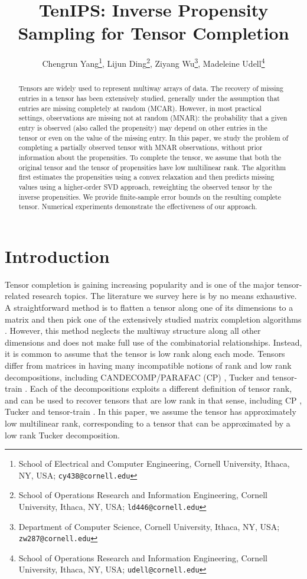\documentclass{article}
\title{TenIPS: Inverse Propensity Sampling for Tensor Completion}
\date{}
\author{Chengrun Yang\footnote{School of Electrical and Computer Engineering, Cornell University, Ithaca, NY, USA; \texttt{cy438@cornell.edu}}, Lijun Ding\footnote{School of Operations Research and Information Engineering, Cornell University,
		Ithaca, NY, USA; \texttt{ld446@cornell.edu}}, Ziyang Wu\footnote{Department of Computer Science, Cornell University,
		Ithaca, NY, USA;
		\texttt{zw287@cornell.edu}}, Madeleine Udell\footnote{School of Operations Research and Information Engineering, Cornell University,
		Ithaca, NY, USA;
		\texttt{udell@cornell.edu}}}
\theoremstyle{plain}
\begin{document}
\maketitle

\begin{abstract}
Tensors are widely used to represent multiway arrays of data.
The recovery of missing entries in a tensor has been extensively studied,
generally under the assumption that entries are missing completely at random (MCAR).
However, in most practical settings, observations are missing not at random (MNAR):
the probability that a given entry is observed (also called the propensity)
may depend on other entries in the tensor
or even on the value of the missing entry.
In this paper, we study the problem of completing a partially observed tensor with MNAR observations,
without prior information about the propensities.
To complete the tensor,
we assume that both the original tensor and the tensor of propensities have low multilinear rank.
The algorithm first estimates the propensities using a convex relaxation
and then predicts missing values using a higher-order SVD approach, reweighting the observed tensor by the inverse propensities.
We provide finite-sample error bounds on the resulting complete tensor.
Numerical experiments demonstrate the effectiveness of our approach.
\end{abstract}

\section{Introduction}
Tensor completion is gaining increasing popularity and is one of the major tensor-related research topics.
The literature we survey here is by no means exhaustive.
A straightforward method is to flatten a tensor along one of its dimensions to a matrix and then pick one of the extensively studied matrix completion algorithms \cite{candes2010power, negahban2012restricted, cai2013max}.
However, this method neglects the multiway structure along all other dimensions and does not make full use of the combinatorial relationships.
Instead, it is common to assume that the tensor is low rank along each mode.
Tensors differ from matrices in having many incompatible notions of
rank and low rank decompositions,
including CANDECOMP/PARAFAC (CP) \cite{carroll1970analysis, harshman1970foundations},
Tucker \cite{tucker1966some}
and tensor-train \cite{oseledets2011tensor}.
Each of the decompositions exploits a different definition of tensor rank,
and can be used to recover tensors that are low rank in that sense, including
CP \cite{krishnamurthy2013low, jain2014provable, barak2016noisy, ashraphijuo2017fundamental, ghadermarzy2018learning, liu2020tensor}, Tucker \cite{gandy2011tensor, mu2014square, xia2017statistically, yokota2018missing, zhang2019cross, huang2020hosvd} and tensor-train \cite{wang2016tensor, yuan2018high}.
In this paper, we assume the tensor has approximately low multilinear rank, corresponding to a tensor that can be approximated by a low rank Tucker decomposition.
\end{document}
